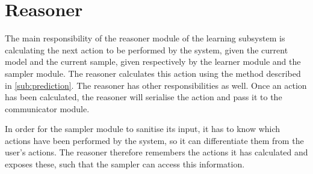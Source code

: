 \section{Reasoner}\label{sec:Reasoner}
The main responsibility of the reasoner module of the learning subsystem is calculating the next action to be performed by the system, given the current model and the current sample, given respectively by the learner module and the sampler module.
The reasoner calculates this action using the method described in \cref{sub:prediction}.
The reasoner has other responsibilities as well. Once an action has been calculated, the reasoner will serialise the action and pass it to the communicator module.

In order for the sampler module to sanitise its input, it has to know which actions have been performed by the system, so it can differentiate them from the user's actions. The reasoner therefore remembers the actions it has calculated and exposes these, such that the sampler can access this information.
